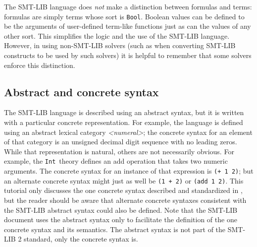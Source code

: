\documentclass[12pt,oneside]{report}
\newcommand{\numeral}{{\it <numeral>}}
\newcommand{\Bool}{{\tt Bool}}
\newcommand{\Int}{{\tt Int}}
\begin{document}
The SMT-LIB language does {\em not} make a distinction between formulas and terms: formulas are simply terms whose sort is \Bool. Boolean values can be defined to be the arguments of user-defined term-like functions just as can the values of any other sort. This simplifies the logic and the use of the SMT-LIB language.
However, in using non-SMT-LIB solvers (such as when converting SMT-LIB constructs to be used by such solvers) it is helpful to remember that
some solvers enforce this distinction.

\subsection{Abstract and concrete syntax}

The SMT-LIB language is described using an abstract syntax, but it is written with a particular concrete representation. For example, the language is defined using an abstract lexical category \numeral; the concrete syntax for an element of that category is an unsigned decimal digit sequence with no leading zeros.  While that representation is natural, others are not necessarily obvious.  For example, the \Int\ theory defines an add operation that takes two numeric arguments.  The concrete syntax for an instance of that expression is {\tt (+ 1 2)}; but an alternate concrete syntax might just as well be {\tt (1 + 2)} or {\tt (add 1 2)}.  This tutorial only discusses the one concrete syntax described and standardized in \cite{BarST-SMT-10}, but the reader should be aware that alternate concrete syntaxes consistent with the SMT-LIB abstract syntax could also be defined. 
Note that the SMT-LIB document uses the abstract syntax only to facilitate the definition of the one concrete syntax and its semantics. The abstract syntax is not part of the SMT-LIB 2 standard, only the concrete syntax is.



\pagebreak
\end{document}
